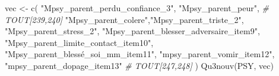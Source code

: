 \documentclass[
]{article}
\newenvironment{Shaded}{\begin{snugshade}}{\end{snugshade}}
\newcommand{\CommentTok}[1]{\textcolor[rgb]{0.56,0.35,0.01}{\textit{#1}}}
\newcommand{\FunctionTok}[1]{\textcolor[rgb]{0.00,0.00,0.00}{#1}}
\newcommand{\NormalTok}[1]{#1}
\newcommand{\OtherTok}[1]{\textcolor[rgb]{0.56,0.35,0.01}{#1}}
\newcommand{\StringTok}[1]{\textcolor[rgb]{0.31,0.60,0.02}{#1}}
\begin{document}
\begin{Shaded}
\begin{Highlighting}[]
\NormalTok{vec }\OtherTok{\textless{}{-}} \FunctionTok{c}\NormalTok{(}
    \StringTok{"Mpsy\_parent\_perdu\_confiance\_3"}\NormalTok{, }\StringTok{"Mpsy\_parent\_peur"}\NormalTok{,             }\CommentTok{\# TOUT[239,240]  }
    \StringTok{"Mpsy\_parent\_colere"}\NormalTok{,}\StringTok{"Mpsy\_parent\_triste\_2"}\NormalTok{,                                }
    \StringTok{"Mpsy\_parent\_stress\_2"}\NormalTok{, }\StringTok{"Mpsy\_parent\_blesser\_adversaire\_item9"}\NormalTok{,               }
    \StringTok{"Mpsy\_parent\_limite\_contact\_item10"}\NormalTok{, }\StringTok{"Mpsy\_parent\_blessé\_soi\_mm\_item11"}\NormalTok{,                }
    \StringTok{"mpsy\_parent\_vomir\_item12"}\NormalTok{, }\StringTok{"mpsy\_parent\_dopage\_item13"}  \CommentTok{\# TOUT[247,248] }
\NormalTok{)}
\FunctionTok{Qu3nouv}\NormalTok{(PSY, vec)}
\end{Highlighting}
\end{Shaded}
\end{document}
